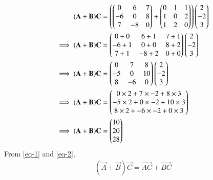 \documentclass[journal,12pt,twocolumn]{IEEEtran}
\begin{document}
\begin{align}
    (\mathbf{A}+\mathbf{B})\mathbf{C}&=\left(\begin{pmatrix}0&6&7\\-6&0&8\\7&-8&0\end{pmatrix}+\begin{pmatrix}0&1&1\\1&0&2\\1&2&0\end{pmatrix}\right)\begin{pmatrix}2\\-2\\3\end{pmatrix}\\
    \implies (\mathbf{A}+\mathbf{B})\mathbf{C}&=\begin{pmatrix}0+0&6+1&7+1\\-6+1&0+0&8+2\\7+1&-8+2&0+0\end{pmatrix}\begin{pmatrix}2\\-2\\3\end{pmatrix}\\
    \implies (\mathbf{A}+\mathbf{B})\mathbf{C}&=\begin{pmatrix}0&7&8\\-5&0&10\\8&-6&0\end{pmatrix}\begin{pmatrix}2\\-2\\3\end{pmatrix}\\
    \implies (\mathbf{A}+\mathbf{B})\mathbf{C}&=\begin{pmatrix}0\times2+7\times-2+8\times3\\-5\times2+0\times-2+10\times3\\8\times2+-6\times-2+0\times3\end{pmatrix}\\
    \implies (\mathbf{A}+\mathbf{B})\mathbf{C}&=\begin{pmatrix}10\\20\\28\end{pmatrix} \label{eq-1}
\end{align}
From \eqref{eq-1} and \eqref{eq-2},
\begin{align}
    (\vec{A}+\vec{B})\vec{C}=\vec{AC}+\vec{BC}
\end{align}
\end{document}
